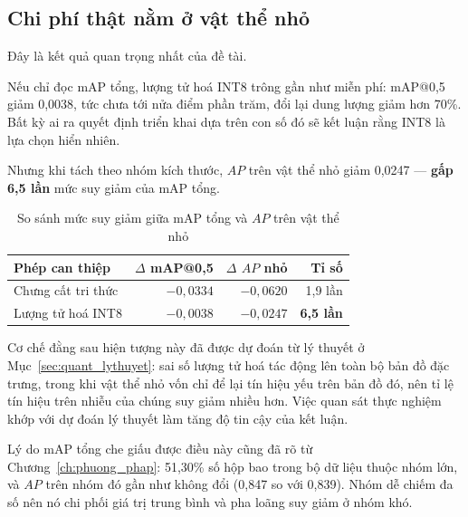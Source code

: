 \subsection{Chi phí thật nằm ở vật thể nhỏ}
\label{sec:ap_nho_ket_qua}

Đây là kết quả quan trọng nhất của đề tài.

Nếu chỉ đọc mAP tổng, lượng tử hoá INT8 trông gần như miễn phí: mAP@0,5 giảm 0,0038, tức chưa tới
nửa điểm phần trăm, đổi lại dung lượng giảm hơn 70\%. Bất kỳ ai ra quyết định triển khai dựa trên
con số đó sẽ kết luận rằng INT8 là lựa chọn hiển nhiên.

Nhưng khi tách theo nhóm kích thước, $AP$ trên vật thể nhỏ giảm 0,0247 --- \textbf{gấp 6,5 lần} mức
suy giảm của mAP tổng.

\begin{table}[H]
\centering
\caption{So sánh mức suy giảm giữa mAP tổng và $AP$ trên vật thể nhỏ}
\label{tab:pha_loang}
\small
\begin{tabular}{lrrr}
\toprule
\textbf{Phép can thiệp} & \textbf{$\Delta$ mAP@0,5} & \textbf{$\Delta$ $AP$ nhỏ} & \textbf{Tỉ số} \\
\midrule
Chưng cất tri thức & $-0{,}0334$ & $-0{,}0620$ & 1,9 lần \\
Lượng tử hoá INT8  & $-0{,}0038$ & $-0{,}0247$ & \textbf{6,5 lần} \\
\bottomrule
\end{tabular}
\end{table}


Cơ chế đằng sau hiện tượng này đã được dự đoán từ lý thuyết ở Mục~\ref{sec:quant_lythuyet}: sai số
lượng tử hoá tác động lên toàn bộ bản đồ đặc trưng, trong khi vật thể nhỏ vốn chỉ để lại tín hiệu
yếu trên bản đồ đó, nên tỉ lệ tín hiệu trên nhiễu của chúng suy giảm nhiều hơn. Việc quan sát thực
nghiệm khớp với dự đoán lý thuyết làm tăng độ tin cậy của kết luận.

Lý do mAP tổng che giấu được điều này cũng đã rõ từ Chương~\ref{ch:phuong_phap}: 51,30\% số hộp bao
trong bộ dữ liệu thuộc nhóm lớn, và $AP$ trên nhóm đó gần như không đổi (0,847 so với 0,839). Nhóm
dễ chiếm đa số nên nó chi phối giá trị trung bình và pha loãng suy giảm ở nhóm khó.

